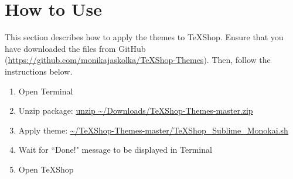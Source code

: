\documentclass{article}
\begin{document}
\section{How to Use}
This section describes how to apply the themes to TeXShop. Ensure that you have downloaded the files from GitHub (\url{https://github.com/monikajaskolka/TeXShop-Themes}). Then, follow the instructions below.

\begin{enumerate}
	\item Open Terminal
	\item Unzip package: \url{unzip ~/Downloads/TeXShop-Themes-master.zip}
	\item Apply theme: \url{~/TeXShop-Themes-master/TeXShop_Sublime_Monokai.sh}
	\item Wait for ``Done!" message to be displayed in Terminal
	\item Open TeXShop
\end{enumerate}
\end{document}
